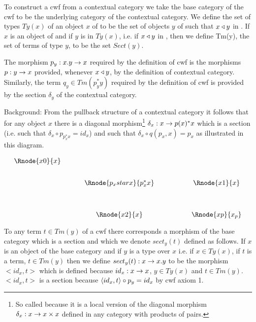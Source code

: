 \documentclass[10pt,a4paper]{article}
\theoremstyle{remark}
\begin{document}
\note To construct a cwf from a contextual category we take the base category of the cwf to be the underlying category of the contextual category. We define the set of types $Ty(x)$ of an object 
$x$ of \catcw to be the set of objects $y$ of \catcw such that $x \triangleleft y$ in \catc. 
If $x$ is an object of \catcw and if $y$ is in $Ty(x)$, i.e. if $x \triangleleft y$ in \catc, then
we define Tm(y), the set of terms of type $y$, to be the set $Sect(y)$.

The morphism $p_y: x.y \rightarrow x$ required by the definition of cwf is the morphisms $p: y \rightarrow x$ provided, whenever $x \triangleleft y$, by the definition of contextual category.
Similarly, the term $q_y \in Tm(p_y ^* y)$ required by the definition of cwf is provided by the 
section $\delta_y$ of the contextual category. 

\note 
Background: From the pullback structure of  a contextual category it follows that for any
object $x$ there is a diagonal morphism\footnote{So called because it is a local version of the diagonal 
morphism $\delta_x:x \rightarrow x \times x$  defined in any category with products of pairs.}
$\delta_x : x \rightarrow p(x)^*x$ which is a section (i.e. such that $\delta_x \circ p_{p_x^*x} = id_x$) and such that $\delta_x \circ q(p_x,x)=p_x$ as illustrated in this diagram.

\vspace{3mm}
\begin{center}
\begin{equation*}
\label{pullback}
\begin{array}{cp{0.5cm}cp{1.2cm}c}
\Rnode{x0}{x} &&                     &&           \\ [0.7cm]
             &&\Rnode{p_xstarx}{p_x^*x} && \Rnode{x1}{x}\\ [1.2cm]
             &&\Rnode{x2}{x}         && \Rnode{xp}{x_p}
\end{array}
\end{equation*}
\setlength{\arrnodesepA}{3pt}
\end{center}  

\note To any term $t \in Tm(y)$  of a cwf \catcw there corresponds a morphism of the base category which is a section
and which we denote $sect_y(t)$  defined as follows. 
If $x$ is an object of the base category and if 
$y$ is a type over $x$ i.e. if $x \in Ty(x)$, if $t$ is a term, $t \in Tm(y)$ 
then we define $sect_y(t): x \rightarrow x.y$
to be the morphism $<id_x,t>$ which is defined because $id_x : x \rightarrow x$, $y \in Ty(x)$ and $t \in Tm(y)$.
$<id_x,t>$ is a section because $\langle id_x,t\rangle \circ p_y=id_x$ by cwf axiom 1.
\end{document}
